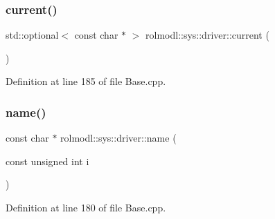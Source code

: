 \subsubsection{\texorpdfstring{current()}{current()}}
{\footnotesize\ttfamily std\+::optional$<$ const char $\ast$ $>$ rolmodl\+::sys\+::driver\+::current (\begin{DoxyParamCaption}{ }\end{DoxyParamCaption})\hspace{0.3cm}{\ttfamily [noexcept]}}



Definition at line 185 of file Base.\+cpp.

\mbox{\label{namespacerolmodl_1_1sys_1_1driver_a694e500336cf0a5371776be6f2054db5}} 
\subsubsection{\texorpdfstring{name()}{name()}}
{\footnotesize\ttfamily const char $\ast$ rolmodl\+::sys\+::driver\+::name (\begin{DoxyParamCaption}\item[{const unsigned int}]{i }\end{DoxyParamCaption})}



Definition at line 180 of file Base.\+cpp.


